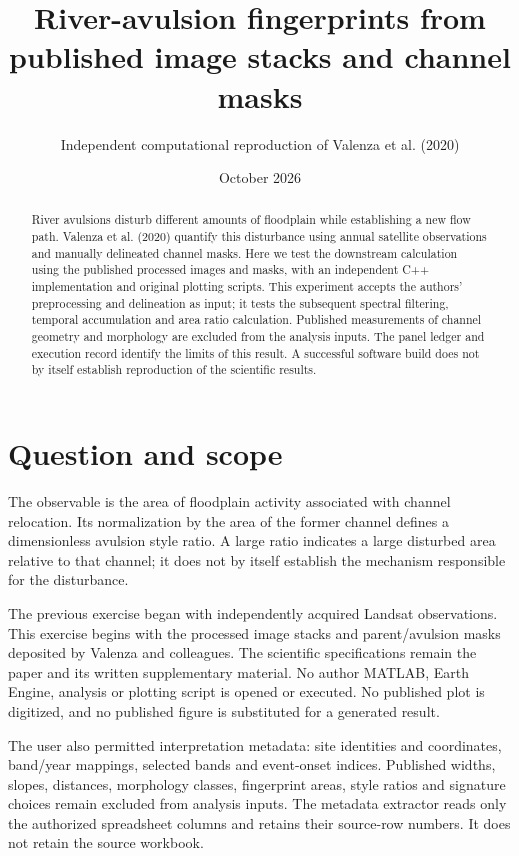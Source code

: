 \documentclass[11pt]{article}
\title{River-avulsion fingerprints from published image stacks and channel masks}
\author{Independent computational reproduction of Valenza et al. (2020)}
\date{October 2026}
\begin{document}
\maketitle
\begin{abstract}
River avulsions disturb different amounts of floodplain while establishing a
new flow path. Valenza et al. (2020) quantify this disturbance using annual
satellite observations and manually delineated channel masks. Here we test
the downstream calculation using the published processed images and masks,
with an independent C++ implementation and original plotting scripts.
This experiment accepts the authors' preprocessing and delineation as input;
it tests the subsequent spectral filtering, temporal accumulation and area
ratio calculation. Published measurements of channel geometry and morphology
are excluded from the analysis inputs. 
The panel ledger and execution record identify the limits of this result. A successful software build
does not by itself establish reproduction of the scientific results.
\end{abstract}

\section{Question and scope}
The observable is the area of floodplain activity associated with channel
relocation. Its normalization by the area of the former channel defines a
dimensionless avulsion style ratio. A large ratio indicates a large disturbed
area relative to that channel; it does not by itself establish the mechanism
responsible for the disturbance.

The previous exercise began with independently acquired Landsat observations.
This exercise begins with the processed image stacks and parent/avulsion masks
deposited by Valenza and colleagues. The scientific specifications remain the
paper and its written supplementary material. No author MATLAB, Earth Engine,
analysis or plotting script is opened or executed. No published plot is
digitized, and no published figure is substituted for a generated result.

The user also permitted interpretation metadata: site identities and
coordinates, band/year mappings, selected bands and event-onset indices.
Published widths, slopes, distances, morphology classes, fingerprint areas,
style ratios and signature choices remain excluded from analysis inputs.
The metadata extractor reads only the authorized spreadsheet columns and
retains their source-row numbers. It does not retain the source workbook.
\end{document}

